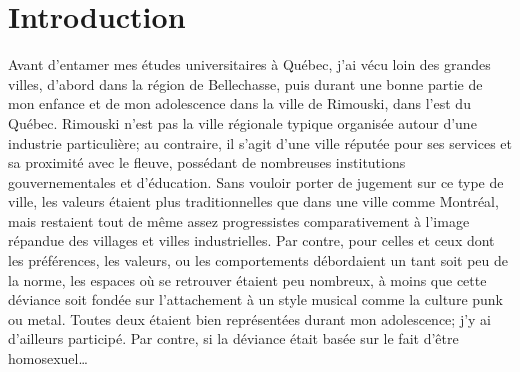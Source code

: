 \chapter*{Introduction}         %

Avant d'entamer mes études universitaires à Québec, j'ai vécu loin des grandes villes, d'abord dans la région de Bellechasse, puis durant une bonne partie de mon enfance et de mon adolescence dans la ville de Rimouski, dans l'est du Québec.
Rimouski n'est pas la ville régionale typique organisée autour d'une industrie particulière; au contraire, il s'agit d'une ville réputée pour ses services et sa proximité avec le fleuve, possédant de nombreuses institutions gouvernementales et d'éducation.
Sans vouloir porter de jugement sur ce type de ville, les valeurs étaient plus traditionnelles que dans une ville comme Montréal, mais restaient tout de même assez progressistes comparativement à l'image répandue des villages et villes industrielles.
Par contre, pour celles et ceux dont les préférences, les valeurs, ou les comportements débordaient un tant soit peu de la norme, les espaces où se retrouver étaient peu nombreux, à moins que cette déviance soit fondée sur l'attachement à un style musical comme la culture punk ou metal.
Toutes deux étaient bien représentées durant mon adolescence; j'y ai d'ailleurs participé.
Par contre, si la déviance était basée sur le fait d'être homosexuel\ldots{}

